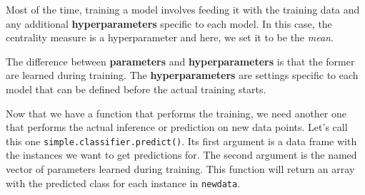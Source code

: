\documentclass[
  11pt,
]{krantz}
\makeatletter
\newenvironment{Shaded}{\begin{snugshade}}{\end{snugshade}}
\newcommand{\CommentTok}[1]{\textcolor[rgb]{0.37,0.37,0.37}{\textit{#1}}}
\newcommand{\ConstantTok}[1]{\textcolor[rgb]{0,0,0}{#1}}
\newcommand{\ControlFlowTok}[1]{\textcolor[rgb]{0.27,0.27,0.27}{\textbf{#1}}}
\newcommand{\DecValTok}[1]{\textcolor[rgb]{0.06,0.06,0.06}{#1}}
\newcommand{\FunctionTok}[1]{\textcolor[rgb]{0,0,0}{#1}}
\newcommand{\NormalTok}[1]{#1}
\newcommand{\OtherTok}[1]{\textcolor[rgb]{0.37,0.37,0.37}{#1}}
\newcommand{\SpecialCharTok}[1]{\textcolor[rgb]{0,0,0}{#1}}
\newenvironment{kframe}{%
\medskip{}
\setlength{\fboxsep}{.8em}
 \def\at@end@of@kframe{}%
 \ifinner\ifhmode%
  \def\at@end@of@kframe{\end{minipage}}%
  \begin{minipage}{\columnwidth}%
 \fi\fi%
 \def\FrameCommand##1{\hskip\@totalleftmargin \hskip-\fboxsep
 \colorbox{shadecolor}{##1}\hskip-\fboxsep
     \hskip-\linewidth \hskip-\@totalleftmargin \hskip\columnwidth}%
 \MakeFramed {\advance\hsize-\width
   \@totalleftmargin\z@ \linewidth\hsize
   \@setminipage}}%
 {\par\unskip\endMakeFramed%
 \at@end@of@kframe}
\newenvironment{rmdblock}[1]
  {
  \begin{itemize}
  \renewcommand{\labelitemi}{
    \raisebox{-.7\height}[0pt][0pt]{
      {\setkeys{Gin}{width=3em,keepaspectratio}\texttt{[image: images/icons/\#1]}}
    }
  }
  \setlength{\fboxsep}{1em}
  \begin{kframe}
  \item
  }
  {
  \end{kframe}
  \end{itemize}
  }
\newenvironment{rmdinfo}
  {\begin{rmdblock}{info}}
  {\end{rmdblock}}
\makeatother
\begin{document}
Most of the time, training a model involves feeding it with the training data and any additional \textbf{hyperparameters} specific to each model. In this case, the centrality measure is a hyperparameter and here, we set it to be the \emph{mean}.

\begin{rmdinfo}
The difference between \textbf{parameters} and \textbf{hyperparameters} is that the former are learned during training. The \textbf{hyperparameters} are settings specific to each model that can be defined before the actual training starts.
\end{rmdinfo}

Now that we have a function that performs the training, we need another one that performs the actual inference or prediction on new data points. Let's call this one \texttt{simple.classifier.predict()}. Its first argument is a data frame with the instances we want to get predictions for. The second argument is the named vector of parameters learned during training. This function will return an array with the predicted class for each instance in \texttt{newdata}.

\begin{Shaded}
\end{Shaded}
\end{document}
